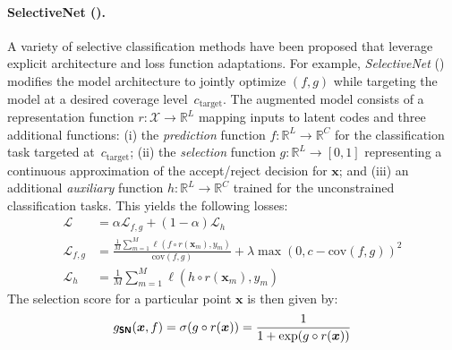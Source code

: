 \paragraph{SelectiveNet (\sn).} 
A variety of selective classification methods have been proposed that leverage explicit architecture and loss function adaptations. For example, \emph{SelectiveNet} (\sn) \citep{geifman2019selectivenet} modifies the model architecture to jointly optimize $(f,g)$ while targeting the model at a desired coverage level~$c_\text{target}$. The augmented model consists of a representation function $r: \mathcal{X} \rightarrow \mathbb{R}^L$ mapping inputs to latent codes and three additional functions: (i) the \emph{prediction} function $f: \mathbb{R}^L \rightarrow \mathbb{R}^C$ for the classification task targeted at~$c_\text{target}$; (ii) the \emph{selection} function $g: \mathbb{R}^L \rightarrow [0,1]$ representing a continuous approximation of the accept/reject decision for $\bm{x}$; and (iii) an additional \emph{auxiliary} function $h: \mathbb{R}^L \rightarrow \mathbb{R}^C$ trained for the unconstrained classification tasks. This yields the following losses:
 \begin{align}
 	\mathcal{L} & = \alpha \mathcal{L}_{f,g} + (1-\alpha) \mathcal{L}_h \\
 	\mathcal{L}_{f,g} & = \frac{\frac{1}{M}\sum_{m=1}^{M} \ell( f \circ r(\bm{x}_m) , y_m)}{\text{cov}(f,g)} + \lambda \max(0, c - \text{cov}(f,g))^2 \\
 	\mathcal{L}_{h} & = \frac{1}{M}\sum_{m=1}^{M} \ell( h \circ r(\bm{x}_m) , y_m)
 \end{align}
 The selection score for a particular point $\bm{x}$ is then given by:
 \begin{equation}
 	g_{\textbf{\sffamily SN}}(\bm{x}, f) = \sigma(g \circ r(\bm{x})) = \frac{1}{1 + \exp(g \circ r(\bm{x}))}
 \end{equation}

